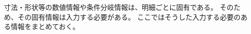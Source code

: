 









寸法・形状等の数値情報や条件分岐情報は、明細ごとに固有である。
そのため、その固有情報は入力する必要がある。
ここではそうした入力する必要のある情報をまとめておく。




\begin{appendices}


\end{appendices}
